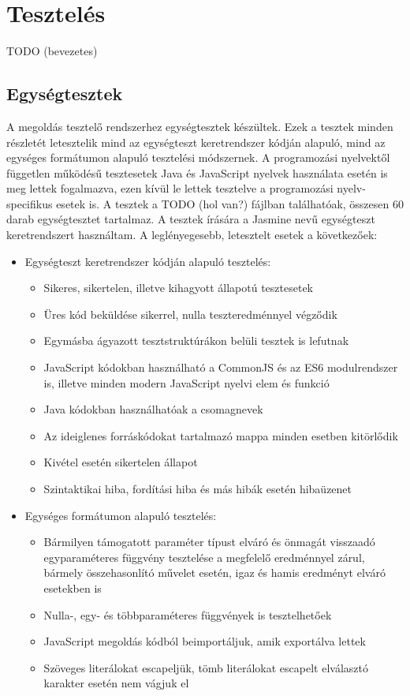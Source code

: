 \documentclass{elteikthesis}
\begin{document}
		\section{Tesztelés}
		TODO (bevezetes)

			\subsection{Egységtesztek}
				A megoldás tesztelő rendszerhez egységtesztek készültek. Ezek a tesztek minden részletét letesztelik mind az egységteszt keretrendszer kódján alapuló, mind az egységes formátumon alapuló tesztelési módszernek. A programozási nyelvektől független működésű tesztesetek Java és JavaScript nyelvek használata esetén is meg lettek fogalmazva, ezen kívül le lettek tesztelve a programozási nyelv-specifikus esetek is. A tesztek a TODO (hol van?) fájlban találhatóak, összesen 60 darab egységtesztet tartalmaz. A tesztek írására a Jasmine nevű egységteszt keretrendszert használtam. A leglényegesebb, letesztelt esetek a következőek:
				\begin{itemize}
					\item Egységteszt keretrendszer kódján alapuló tesztelés:
					\begin{itemize}
						\item Sikeres, sikertelen, illetve kihagyott állapotú tesztesetek
						\item Üres kód beküldése sikerrel, nulla teszteredménnyel végződik
						\item Egymásba ágyazott tesztstruktúrákon belüli tesztek is lefutnak
						\item JavaScript kódokban használható a CommonJS és az ES6 modulrendszer is, illetve minden modern JavaScript nyelvi elem és funkció
						\item Java kódokban használhatóak a csomagnevek
						\item Az ideiglenes forráskódokat tartalmazó mappa minden esetben kitörlődik
						\item Kivétel esetén sikertelen állapot
						\item Szintaktikai hiba, fordítási hiba és más hibák esetén hibaüzenet
					\end{itemize}
					\item Egységes formátumon alapuló tesztelés:
					\begin{itemize}
						\item Bármilyen támogatott paraméter típust elváró és önmagát visszaadó egyparaméteres függvény tesztelése a megfelelő eredménnyel zárul, bármely összehasonlító művelet esetén, igaz és hamis eredményt elváró esetekben is
						\item Nulla-, egy- és többparaméteres függvények is tesztelhetőek
						\item JavaScript megoldás kódból beimportáljuk, amik exportálva lettek
						\item Szöveges literálokat escapeljük, tömb literálokat escapelt elválasztó karakter esetén nem vágjuk el
					\end{itemize}
				\end{itemize}
			
\end{document}
